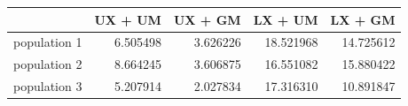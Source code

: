 \begin{tabular}{lrrrr}
\toprule
 & UX + UM & UX + GM & LX + UM & LX + GM \\
\midrule
population 1 & 6.505498 & 3.626226 & 18.521968 & 14.725612 \\
population 2 & 8.664245 & 3.606875 & 16.551082 & 15.880422 \\
population 3 & 5.207914 & 2.027834 & 17.316310 & 10.891847 \\
\bottomrule
\end{tabular}
